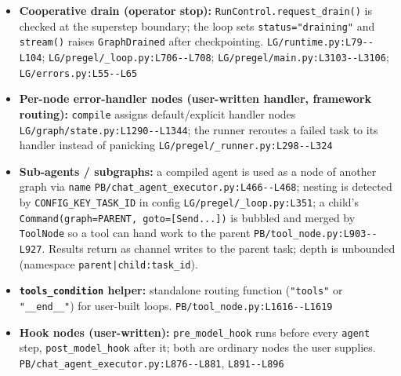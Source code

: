 \begin{itemize}
\item \textbf{Cooperative drain (operator stop):} \texttt{RunControl.\allowbreak{}request\_\allowbreak{}drain(\allowbreak{})} is checked at the superstep boundary; the loop sets \texttt{status="draining"} and \texttt{stream(\allowbreak{})} raises \texttt{GraphDrained} after checkpointing. \texttt{LG/\allowbreak{}runtime.\allowbreak{}py:\allowbreak{}L79-\allowbreak{}-\allowbreak{}L104}; \texttt{LG/\allowbreak{}pregel/\allowbreak{}\_\allowbreak{}loop.\allowbreak{}py:\allowbreak{}L706-\allowbreak{}-\allowbreak{}L708}; \texttt{LG/\allowbreak{}pregel/\allowbreak{}main.\allowbreak{}py:\allowbreak{}L3103-\allowbreak{}-\allowbreak{}L3106}; \texttt{LG/\allowbreak{}errors.\allowbreak{}py:\allowbreak{}L55-\allowbreak{}-\allowbreak{}L65}
\item \textbf{Per-node error-handler nodes (user-written handler, framework routing):} \texttt{compile} assigns default/explicit handler nodes \texttt{LG/\allowbreak{}graph/\allowbreak{}state.\allowbreak{}py:\allowbreak{}L1290-\allowbreak{}-\allowbreak{}L1344}; the runner reroutes a failed task to its handler instead of panicking \texttt{LG/\allowbreak{}pregel/\allowbreak{}\_\allowbreak{}runner.\allowbreak{}py:\allowbreak{}L298-\allowbreak{}-\allowbreak{}L324}
\item \textbf{Sub-agents / subgraphs:} a compiled agent is used as a node of another graph via \texttt{name} \texttt{PB/\allowbreak{}chat\_\allowbreak{}agent\_\allowbreak{}executor.\allowbreak{}py:\allowbreak{}L466-\allowbreak{}-\allowbreak{}L468}; nesting is detected by \texttt{CONFIG\_\allowbreak{}KEY\_\allowbreak{}TASK\_\allowbreak{}ID} in config \texttt{LG/\allowbreak{}pregel/\allowbreak{}\_\allowbreak{}loop.\allowbreak{}py:\allowbreak{}L351}; a child's \texttt{Command(\allowbreak{}graph=PARENT, goto=[Send.\allowbreak{}.\allowbreak{}.\allowbreak{}])} is bubbled and merged by \texttt{ToolNode} so a tool can hand work to the parent \texttt{PB/\allowbreak{}tool\_\allowbreak{}node.\allowbreak{}py:\allowbreak{}L903-\allowbreak{}-\allowbreak{}L927}. Results return as channel writes to the parent task; depth is unbounded (namespace \texttt{parent|child:\allowbreak{}task\_\allowbreak{}id}).
\item \textbf{\texttt{tools\_\allowbreak{}condition} helper:} standalone routing function (\texttt{"tools"} or \texttt{"\_\allowbreak{}\_\allowbreak{}end\_\allowbreak{}\_\allowbreak{}"}) for user-built loops. \texttt{PB/\allowbreak{}tool\_\allowbreak{}node.\allowbreak{}py:\allowbreak{}L1616-\allowbreak{}-\allowbreak{}L1619}
\item \textbf{Hook nodes (user-written):} \texttt{pre\_\allowbreak{}model\_\allowbreak{}hook} runs before every \texttt{agent} step, \texttt{post\_\allowbreak{}model\_\allowbreak{}hook} after it; both are ordinary nodes the user supplies. \texttt{PB/\allowbreak{}chat\_\allowbreak{}agent\_\allowbreak{}executor.\allowbreak{}py:\allowbreak{}L876-\allowbreak{}-\allowbreak{}L881}, \texttt{L891-\allowbreak{}-\allowbreak{}L896}
\end{itemize}

